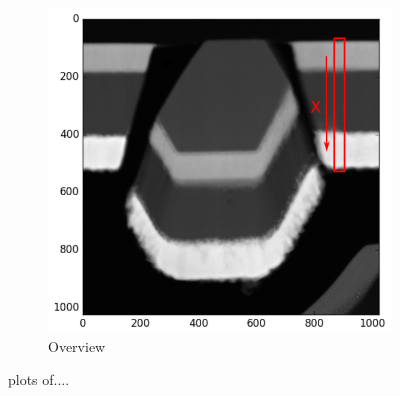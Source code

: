 \begin{figure}
\begin{subfigure}{.5\textwidth}
		\includegraphics[width=\linewidth]{fig/q/2_overview}
		\caption{Overview}
		\label{fig:zeta_area2_overview}
	\end{subfigure}
	\caption{plots of....}
	\label{fig:zeta_area2}
\end{figure}

